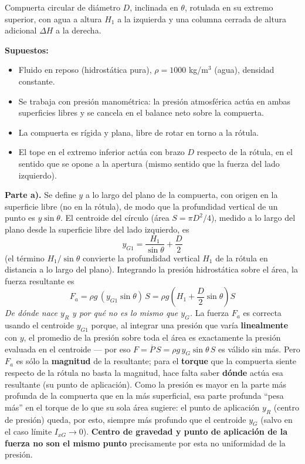 \documentclass[11pt]{article}
\newenvironment{supuestos}{%
  \noindent\textbf{Supuestos:}
  \begin{itemize}[leftmargin=1.4em, itemsep=1pt]
}{%
  \end{itemize}
}
\begin{document}
\noindent Compuerta circular de di\'ametro $D$, inclinada en $\theta$, rotulada en su
extremo superior, con agua a altura $H_1$ a la izquierda y una columna cerrada de
altura adicional $\Delta H$ a la derecha.

\begin{supuestos}
\item Fluido en reposo (hidrost\'atica pura), $\rho=1000$ kg/m$^3$ (agua), densidad
constante.
\item Se trabaja con presi\'on manom\'etrica: la presi\'on atmosf\'erica act\'ua en
ambas superficies libres y se cancela en el balance neto sobre la compuerta.
\item La compuerta es r\'igida y plana, libre de rotar en torno a la r\'otula.
\item El tope en el extremo inferior act\'ua con brazo $D$ respecto de la r\'otula, en
el sentido que se opone a la apertura (mismo sentido que la fuerza del lado izquierdo).
\end{supuestos}

\textbf{Parte a).} Se define $y$ a lo largo del plano de la compuerta, con origen en la
superficie libre (no en la r\'otula), de modo que la profundidad vertical de un punto es
$y\sin\theta$. El centroide del c\'irculo (\'area $S=\pi D^2/4$), medido a lo largo del
plano desde la superficie libre del lado izquierdo, es
\begin{equation}
y_{G1}=\frac{H_1}{\sin\theta}+\frac D2
\end{equation}
(el t\'ermino $H_1/\sin\theta$ convierte la profundidad vertical $H_1$ de la r\'otula en
distancia a lo largo del plano). Integrando la presi\'on hidrost\'atica sobre el \'area,
la fuerza resultante es
\begin{equation}
F_a=\rho g\,(y_{G1}\sin\theta)\,S=\rho g\!\left(H_1+\frac D2\sin\theta\right)S
\end{equation}
\textit{De d\'onde nace $y_R$ y por qu\'e no es lo mismo que $y_G$.} La fuerza $F_a$ es
correcta usando el centroide $y_{G1}$ porque, al integrar una presi\'on que var\'ia
\textbf{linealmente} con $y$, el promedio de la presi\'on sobre toda el \'area es
exactamente la presi\'on evaluada en el centroide --- por eso $F=\overline P\,S=\rho
g\,y_G\sin\theta\,S$ es v\'alido sin m\'as. Pero $F_a$ es s\'olo la \textbf{magnitud} de
la resultante; para el \textbf{torque} que la compuerta siente respecto de la r\'otula
no basta la magnitud, hace falta saber \textbf{d\'onde} act\'ua esa resultante (su punto
de aplicaci\'on). Como la presi\'on es mayor en la parte m\'as profunda de la compuerta
que en la m\'as superficial, esa parte profunda ``pesa m\'as'' en el torque de lo que su
sola \'area sugiere: el punto de aplicaci\'on $y_R$ (centro de presi\'on) queda, por
esto, siempre m\'as profundo que el centroide $y_G$ (salvo en el caso l\'imite $I_{xG}\to
0$). \textbf{Centro de gravedad y punto de aplicaci\'on de la fuerza no son el mismo
punto} precisamente por esta no uniformidad de la presi\'on.
\end{document}
